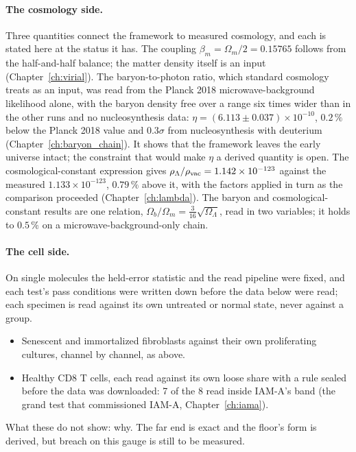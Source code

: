\paragraph{The cosmology side.} Three quantities connect the framework to measured cosmology, and each is stated here at the status it
has. The coupling $\beta_m=\Omega_m/2=0.15765$ follows from the half-and-half balance; the matter density itself is an input
(Chapter~\ref{ch:virial}). \derived{} The baryon-to-photon ratio, which standard cosmology treats as an input, was read from the Planck 2018
microwave-background likelihood alone, with the baryon density free over a range six times wider than in the other runs and no nucleosynthesis data:
$\eta=(6.113\pm0.037)\times10^{-10}$, $0.2\,\%$ below the Planck 2018 value and $0.3\sigma$ from nucleosynthesis with deuterium
(Chapter~\ref{ch:baryon_chain}). \measured{} It shows that the framework leaves the early universe intact; the constraint that would make
$\eta$ a derived quantity is open. \openprob{} The cosmological-constant expression gives $\rho_\Lambda/\rho_{\rm vac}=1.142\times10^{-123}$
against the measured $1.133\times10^{-123}$, $0.79\,\%$ above it, with the factors applied in turn as the comparison proceeded
(Chapter~\ref{ch:lambda}). \fitted{} The baryon and cosmological-constant results are one relation, $\Omega_b/\Omega_m=\tfrac3{16}
\sqrt{\Omega_\Lambda}$, read in two variables; it holds to $0.5\,\%$ on a microwave-background-only chain. \observed

\paragraph{The cell side.} On single molecules the held-error statistic and the read pipeline were fixed, and each test's pass conditions
were written down before the data below were read; each specimen is read against its own untreated or normal state, never against
a group.
\begin{itemize}
\item Senescent and immortalized fibroblasts against their own proliferating cultures, channel by channel, as above. \measured
\item Healthy CD8 T cells, each read against its own loose share with a rule sealed before the data was downloaded: 7 of the 8 read inside IAM-A's band (the grand test that commissioned IAM-A, Chapter~\ref{ch:iama}). \measured
\end{itemize}
What these do not show: why. The far end is exact and the floor's form is derived, but breach on this gauge is still to be
measured. \openprob

